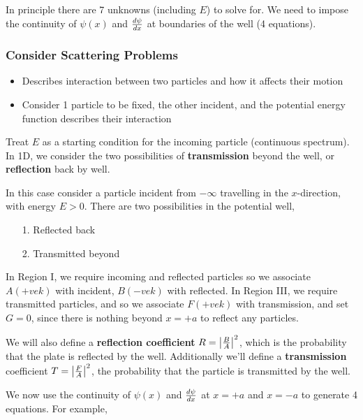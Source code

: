 \documentclass[english, 11pt]{article}
\begin{document}
      In principle there are 7 unknowns (including $E$) to solve for. We need to impose the continuity of $\psi(x)$ and $\frac{d\psi}{dx}$ at boundaries of the well (4 equations). \newline

      \subsubsection{Consider Scattering Problems}

        \begin{itemize}
          \item Describes interaction between two particles and how it affects their motion
          \item Consider 1 particle to be fixed, the other incident, and the potential energy function describes their interaction
        \end{itemize}

        Treat $E$ as a starting condition for the incoming particle (continuous spectrum). In 1D, we consider the two possibilities of \textbf{transmission} beyond the well, or \textbf{reflection} back by well. \newline

        In this case consider a particle incident from $-\infty$ travelling in the $x$-direction, with energy $E > 0$. There are two possibilities in the potential well,
        \begin{itemize}
          \item[1.] Reflected back
          \item[2.] Transmitted beyond
        \end{itemize}
        In Region I, we require incoming and reflected particles so we associate $A(+vek)$ with incident, $B(-vek)$ with reflected.
        In Region III, we require transmitted particles, and so we associate $F(+vek)$ with transmission, and set $G = 0$, since there is nothing beyond $x = +a$ to reflect any particles.\newline

        We will also define a \textbf{reflection coefficient} $R = \left|\frac{B}{A}\right|^2$, which is the probability that the plate is reflected by the well. Additionally we'll define a \textbf{transmission} coefficient $T=\left|\frac{F}{A}\right|^2$, the probability that the particle is transmitted by the well.\newline

        We now use the continuity of $\psi(x)$ and $\frac{d\psi}{dx}$ at $x = +a$ and $x = -a$ to generate 4 equations. For example,
\end{document}
